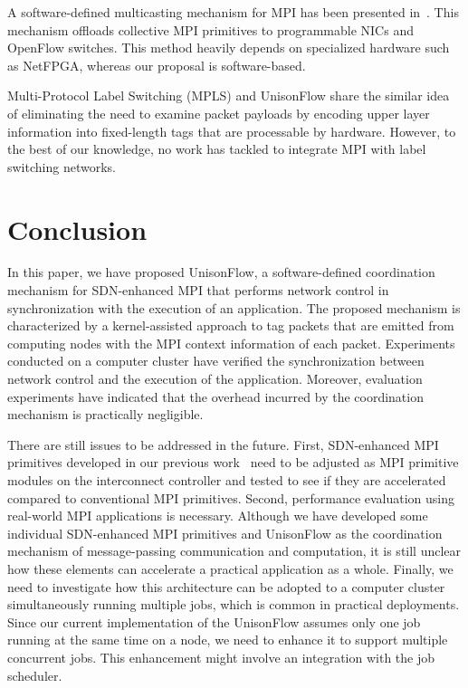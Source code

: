 A software-defined multicasting mechanism for MPI has been presented
in~\autocite{Arap2014}. This mechanism offloads collective MPI primitives to
programmable NICs and OpenFlow switches. This method heavily depends on
specialized hardware such as NetFPGA, whereas our proposal is software-based.

Multi-Protocol Label Switching (MPLS) and UnisonFlow share the similar
idea of eliminating the need to examine packet payloads by encoding
upper layer information into fixed-length tags that are processable by
hardware. However, to the best of our knowledge, no work has tackled to
integrate MPI with label switching networks.

\hypertarget{conclusion}{%
\section{Conclusion}\label{conclusion}}

In this paper, we have proposed UnisonFlow, a software-defined
coordination mechanism for SDN-enhanced MPI that performs network
control in synchronization with the execution of an application. The
proposed mechanism is characterized by a kernel-assisted approach to tag
packets that are emitted from computing nodes with the MPI context
information of each packet. Experiments conducted on a computer cluster
have verified the synchronization between network control and the
execution of the application. Moreover, evaluation experiments have
indicated that the overhead incurred by the coordination mechanism is
practically negligible.

There are still issues to be addressed in the future. First,
SDN-enhanced MPI primitives developed in our previous
work~\autocites{Dashdavaa2014}{Takahashi2014} need to be adjusted as MPI
primitive modules on the interconnect controller and tested to see if
they are accelerated compared to conventional MPI primitives. Second,
performance evaluation using real-world MPI applications is necessary.
Although we have developed some individual SDN-enhanced MPI primitives
and UnisonFlow as the coordination mechanism of message-passing
communication and computation, it is still unclear how these elements
can accelerate a practical application as a whole. Finally, we need to
investigate how this architecture can be adopted to a computer cluster
simultaneously running multiple jobs, which is common in practical
deployments. Since our current implementation of the UnisonFlow assumes
only one job running at the same time on a node, we need to enhance it
to support multiple concurrent jobs. This enhancement might involve an
integration with the job scheduler.
